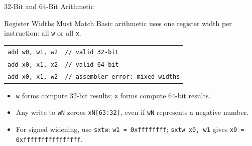 \documentclass[aspectratio=169,11pt,t]{beamer}
\newcommand{\code}[1]{\texttt{#1}}
\begin{document}

\begin{frame}{32-Bit and 64-Bit Arithmetic}
\begin{block}{Register Widths Must Match}
Basic arithmetic uses one register width per instruction: all \code{w} or all \code{x}.
\end{block}
\vspace{0.06cm}
\begin{center}
\footnotesize
\renewcommand{\arraystretch}{1.15}
\begin{tabular}{@{}l l@{}}
\code{add w0, w1, w2} & \code{// valid 32-bit} \\
\code{add x0, x1, x2} & \code{// valid 64-bit} \\
\code{add x0, x1, w2} & \code{// assembler error: mixed widths} \\
\end{tabular}
\end{center}
\vspace{0.03cm}
\begin{itemize}
\item \code{w} forms compute 32-bit results; \code{x} forms compute 64-bit results.
\item Any write to \code{wN} zeroes \code{xN[63:32]}, even if \code{wN} represents a negative number.
\item For signed widening, use \code{sxtw}: \code{w1 = 0xffffffff}; \code{sxtw x0, w1} gives \code{x0 = 0xffffffffffffffff}.
\end{itemize}
\end{frame}



\end{document}
